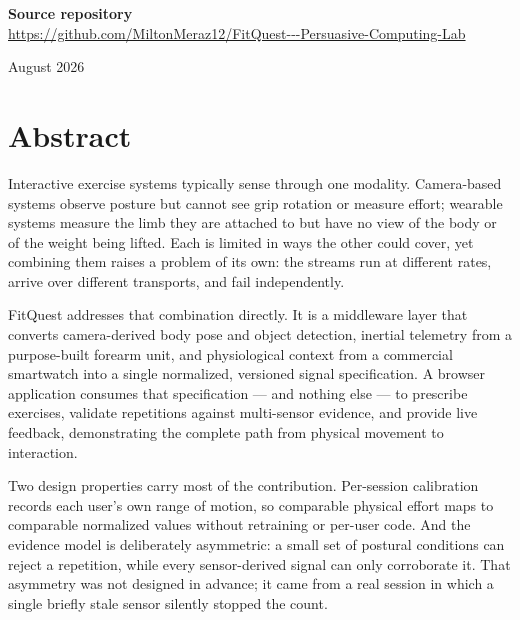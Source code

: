 \documentclass[11pt,a4paper]{article}
\begin{document}
\begin{titlepage}
\vspace{0.6cm}
{\small\textbf{Source repository}\\[2pt]
\url{https://github.com/MiltonMeraz12/FitQuest---Persuasive-Computing-Lab}\par}

\vfill
{\large August 2026\par}
\end{titlepage}
\hypersetup{pageanchor=true}

\tableofcontents
\newpage

\section*{Abstract}

Interactive exercise systems typically sense through one modality. Camera-based
systems observe posture but cannot see grip rotation or measure effort;
wearable systems measure the limb they are attached to but have no view of the
body or of the weight being lifted. Each is limited in ways the other could
cover, yet combining them raises a problem of its own: the streams run at
different rates, arrive over different transports, and fail independently.

FitQuest addresses that combination directly. It is a middleware layer that
converts camera-derived body pose and object detection, inertial telemetry from
a purpose-built forearm unit, and physiological context from a commercial
smartwatch into a single normalized, versioned signal specification. A browser
application consumes that specification --- and nothing else --- to prescribe
exercises, validate repetitions against multi-sensor evidence, and provide live
feedback, demonstrating the complete path from physical movement to interaction.

Two design properties carry most of the contribution. Per-session calibration
records each user's own range of motion, so comparable physical effort maps to
comparable normalized values without retraining or per-user code. And the
evidence model is deliberately asymmetric: a small set of postural conditions
can reject a repetition, while every sensor-derived signal can only corroborate
it. That asymmetry was not designed in advance; it came from a real session in
which a single briefly stale sensor silently stopped the count.
\end{document}
